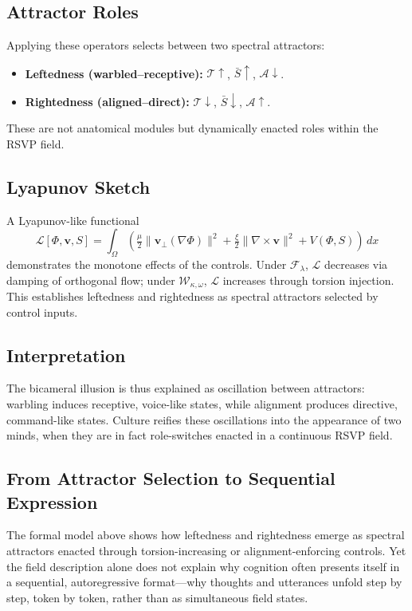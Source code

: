 \documentclass[a4paper,11pt]{article}
\begin{document}
\subsection{Attractor Roles}
Applying these operators selects between two spectral attractors:
\begin{itemize}
    \item \textbf{Leftedness (warbled–receptive):} $\mathcal{T}\uparrow$, $\bar{S}\uparrow$, $\mathcal{A}\downarrow$.
    \item \textbf{Rightedness (aligned–direct):} $\mathcal{T}\downarrow$, $\bar{S}\downarrow$, $\mathcal{A}\uparrow$.
\end{itemize}
These are not anatomical modules but dynamically enacted roles within the RSVP field.

\subsection{Lyapunov Sketch}
A Lyapunov-like functional
\begin{equation}
\mathcal{L}[\Phi,\mathbf{v},S] = 
\int_\Omega \left(
\tfrac{\mu}{2}\|\mathbf{v}_\perp(\nabla\Phi)\|^2 +
\tfrac{\xi}{2}\|\nabla\times \mathbf{v}\|^2 + V(\Phi,S)
\right)\,dx
\end{equation}
demonstrates the monotone effects of the controls. Under $\mathcal{F}_\lambda$, $\mathcal{L}$ decreases via damping of orthogonal flow; under $\mathcal{W}_{\kappa,\omega}$, $\mathcal{L}$ increases through torsion injection. This establishes leftedness and rightedness as spectral attractors selected by control inputs.

\subsection{Interpretation}
The bicameral illusion is thus explained as oscillation between attractors: warbling induces receptive, voice-like states, while alignment produces directive, command-like states. Culture reifies these oscillations into the appearance of two minds, when they are in fact role-switches enacted in a continuous RSVP field.

\subsection{From Attractor Selection to Sequential Expression}

The formal model above shows how leftedness and rightedness emerge as spectral attractors enacted through torsion-increasing or alignment-enforcing controls. Yet the field description alone does not explain why cognition often presents itself in a sequential, autoregressive format—why thoughts and utterances unfold step by step, token by token, rather than as simultaneous field states.
\end{document}

